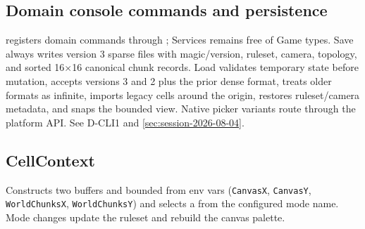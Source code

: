 \subsection{Domain console commands and persistence}
 registers domain commands through
; Services remains free of Game types. Save always
writes version 3 sparse files with magic/version, ruleset, camera, topology,
and sorted 16$\times$16 canonical chunk records. Load validates temporary
state before mutation, accepts versions 3 and 2 plus the prior dense format,
treats older formats as infinite, imports legacy cells around the origin,
restores ruleset/camera metadata, and snaps the bounded view. Native picker variants route through the platform
 API. See D-CLI1 and
\cref{sec:session-2026-08-04}.

\subsection{CellContext}
Constructs two  buffers and bounded
 from
env vars (\texttt{CanvasX}, \texttt{CanvasY}, \texttt{WorldChunksX},
\texttt{WorldChunksY}) and selects a  from the configured
mode name. Mode changes update the ruleset and rebuild the canvas palette.

